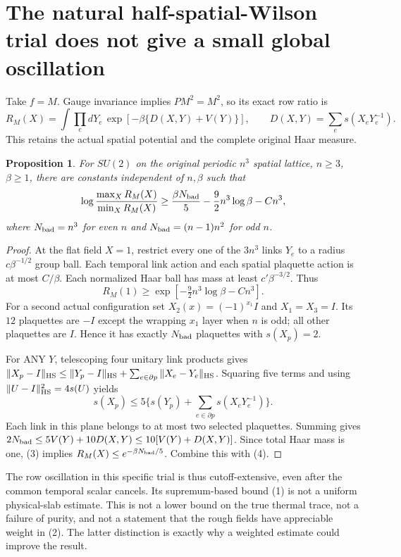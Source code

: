 \documentclass{article}
\newtheorem{proposition}{Proposition}
\begin{document}
\section*{The natural half-spatial-Wilson trial does not give a small global oscillation}
Take $f=M$. Gauge invariance implies $PM^2=M^2$, so its exact row ratio is
\[
 R_M(X)=\int\prod_e dY_e\,
 \exp[-\beta\{D(X,Y)+V(Y)\}],\qquad
 D(X,Y)=\sum_e s(X_eY_e^{-1}).                          \tag{3}
\]
This retains the actual spatial potential and the complete original Haar measure.

\begin{proposition}
For $SU(2)$ on the original periodic $n^3$ spatial lattice, $n\ge3$, $\beta\ge1$, there are constants independent of $n,\beta$ such that
\[
 \log\frac{\max_XR_M(X)}{\min_XR_M(X)}
 \ge \frac{\beta N_{\rm bad}}5-\frac92 n^3\log\beta-Cn^3,
\]
where $N_{\rm bad}=n^3$ for even $n$ and $N_{\rm bad}=(n-1)n^2$ for odd $n$.
\end{proposition}
\begin{proof}
At the flat field $X=1$, restrict every one of the $3n^3$ links $Y_e$ to a radius $c\beta^{-1/2}$ group ball. Each temporal link action and each spatial plaquette action is at most $C/\beta$. Each normalized Haar ball has mass at least $c'\beta^{-3/2}$. Thus
\[
 R_M(1)\ge\exp[-\tfrac92 n^3\log\beta-Cn^3].           \tag{4}
\]
For a second actual configuration set $X_2(x)=(-1)^{x_1}I$ and $X_1=X_3=I$. Its $12$ plaquettes are $-I$ except the wrapping $x_1$ layer when $n$ is odd; all other plaquettes are $I$. Hence it has exactly $N_{\rm bad}$ plaquettes with $s(X_p)=2$.

For ANY $Y$, telescoping four unitary link products gives
$\|X_p-I\|_{\rm HS}\le\|Y_p-I\|_{\rm HS}+\sum_{e\in\partial p}\|X_e-Y_e\|_{\rm HS}$. Squaring five terms and using $\|U-I\|_{\rm HS}^2=4s(U)$ yields
\[
 s(X_p)\le5\{s(Y_p)+\sum_{e\in\partial p}s(X_eY_e^{-1})\}.
\]
Each link in this plane belongs to at most two selected plaquettes. Summing gives $2N_{\rm bad}\le5V(Y)+10D(X,Y)\le10[V(Y)+D(X,Y)]$. Since total Haar mass is one, (3) implies $R_M(X)\le e^{-\beta N_{\rm bad}/5}$. Combine this with (4).
\end{proof}

The row oscillation in this specific trial is thus cutoff-extensive, even after the common temporal scalar cancels. Its supremum-based bound (1) is not a uniform physical-slab estimate. This is not a lower bound on the true thermal trace, not a failure of purity, and not a statement that the rough fields have appreciable weight in (2). The latter distinction is exactly why a weighted estimate could improve the result.
\end{document}
